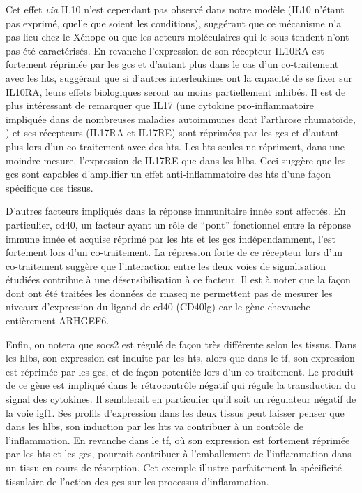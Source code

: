 \documentclass[../main.tex]{subfiles}
\begin{document}
		Cet effet \textit{via} IL10 n'est cependant pas observé dans notre modèle (IL10 n'étant pas exprimé, quelle que soient les conditions), suggérant que ce mécanisme n'a pas lieu chez le Xénope ou que les acteurs moléculaires qui le sous-tendent n'ont pas été caractérisés.
		En revanche l'expression de son récepteur IL10RA est fortement réprimée par les \glspl{gc} et d'autant plus dans le cas d'un co-traitement avec les \glspl{ht}, suggérant que si d'autres interleukines ont la capacité de se fixer sur IL10RA, leurs effets biologiques seront au moins partiellement inhibés.
		Il est de plus intéressant de remarquer que IL17 (une cytokine pro-inflammatoire impliquée dans de nombreuses maladies autoimmunes dont l'arthrose rhumatoïde, \citealp{Onishi2010}) et ses récepteurs (IL17RA et IL17RE) sont réprimées par les \glspl{gc} et d'autant plus lors d'un co-traitement avec des \glspl{ht}.
		Les \glspl{ht} seules ne répriment, dans une moindre mesure, l'expression de IL17RE que dans les \glspl{hlb}.
		Ceci suggère que les \glspl{gc} sont capables d'amplifier un effet anti-inflammatoire des \glspl{ht} d'une façon spécifique des tissus.
		\par
		D'autres facteurs impliqués dans la réponse immunitaire innée sont affectés.
		En particulier, \gls{cd40}, un facteur ayant un rôle de ``pont'' fonctionnel entre la réponse immune innée et acquise \citep{Elgueta2009,Fujii2004} réprimé par les \glspl{ht} et les \glspl{gc} indépendamment, l'est fortement lors d'un co-traitement.
		La répression forte de ce récepteur lors d'un co-traitement suggère que l'interaction entre les deux voies de signalisation étudiées contribue à une désensibilisation à ce facteur.
		Il est à noter que la façon dont ont été traitées les données de \gls{rnaseq} ne permettent pas de mesurer les niveaux d'expression du ligand de \gls{cd40} (CD40lg) car le gène chevauche entièrement ARHGEF6.
		\par
		Enfin, on notera que \gls{socs2} est régulé de façon très différente selon les tissus.
		Dans les \glspl{hlb}, son expression est induite par les \glspl{ht}, alors que dans le \gls{tf}, son expression est réprimée par les \glspl{gc}, et de façon potentiée lors d'un co-traitement.
		Le produit de ce gène est impliqué dans le rétrocontrôle négatif qui régule la transduction du signal des cytokines.
		Il semblerait en particulier qu'il soit un régulateur négatif de la voie \gls{igf}1.
		Ses profils d'expression dans les deux tissus peut laisser penser que dans les \glspl{hlb}, son induction par les \glspl{ht} va contribuer à un contrôle de l'inflammation.
		En revanche dans le \gls{tf}, où son expression est fortement réprimée par les \glspl{ht} et les \glspl{gc}, pourrait contribuer à l'emballement de l'inflammation dans un tissu en cours de résorption.
		Cet exemple illustre parfaitement la spécificité tissulaire de l'action des \glspl{gc} sur les processus d'inflammation.
\end{document}
